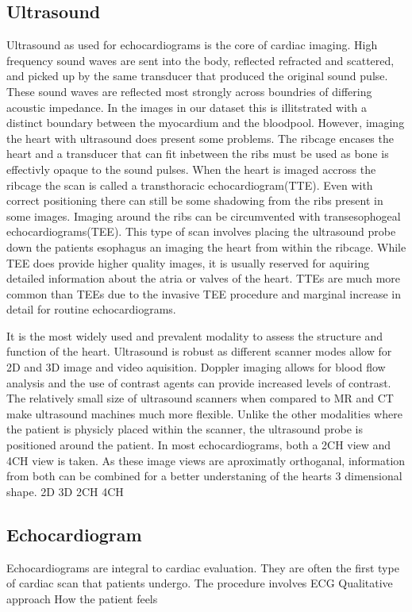 \documentclass[12pt]{article}
\begin{document}
\subsection{Ultrasound}
Ultrasound as used for echocardiograms is the core of cardiac imaging. 
High frequency sound waves are sent into the body, reflected refracted and scattered, and picked up by the same transducer that produced the original sound pulse. 
These sound waves are reflected most strongly across boundries of differing acoustic impedance.
In the images in our dataset this is illitstrated with a distinct boundary between the myocardium and the bloodpool.
However, imaging the heart with ultrasound does present some problems.
The ribcage encases the heart and a transducer that can fit inbetween the ribs must be used as bone is effectivly opaque to the sound pulses. 
When the heart is imaged accross the ribcage the scan is called a transthoracic echocardiogram(TTE).
Even with correct positioning there can still be some shadowing from the ribs present in some images.
Imaging around the ribs can be circumvented with transesophogeal echocardiograms(TEE). 
This type of scan involves placing the ultrasound probe down the patients esophagus an imaging the heart from within the ribcage.
While TEE does provide higher quality images, it is usually reserved for aquiring detailed information about the atria or valves of the heart.
TTEs are much more common than TEEs due to the invasive TEE procedure and marginal increase in detail for routine echocardiograms.

It is the most widely used and prevalent modality to assess the structure and function of the heart.
Ultrasound is robust as different scanner modes allow for 2D and 3D image and video aquisition.
Doppler imaging allows for blood flow analysis and the use of contrast agents can provide increased levels of contrast.
The relatively small size of ultrasound scanners when compared to MR and CT make ultrasound machines much more flexible.
Unlike the other modalities where the patient is physicly placed within the scanner, the ultrasound probe is positioned around the patient.
In most echocardiograms, both a 2CH view and 4CH view is taken. 
As these image views are aproximatly orthoganal, information from both can be combined for a better understaning of the hearts 3 dimensional shape.
2D
3D
2CH
4CH
\subsection{Echocardiogram}
Echocardiograms are integral to cardiac evaluation.
They are often the first type of cardiac scan that patients undergo.
The procedure involves
ECG
Qualitative approach
How the patient feels
\end{document}
